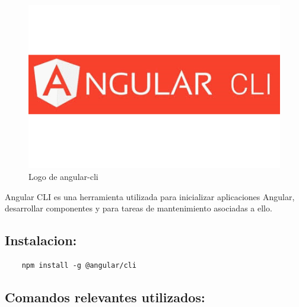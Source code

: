 \documentclass[openright,twoside,10pt]{book}
\begin{document}
    \begin{figure}[H]
        \begin{center}
            \includegraphics[scale=0.3]{img/angular-cli.png}
        \end{center}
        \caption{Logo de angular-cli}
    \end{figure}
    
    Angular CLI es una herramienta utilizada para inicializar aplicaciones
    Angular, desarrollar componentes y para tareas de mantenimiento
    asociadas a ello.
    
    \subsection{Instalacion:}\label{instalacion}
    
    \begin{verbatim}
    npm install -g @angular/cli
    \end{verbatim}
    
    \subsection{Comandos relevantes
    utilizados:}\label{comandos-relevantes-utilizados}
    
\end{document}

